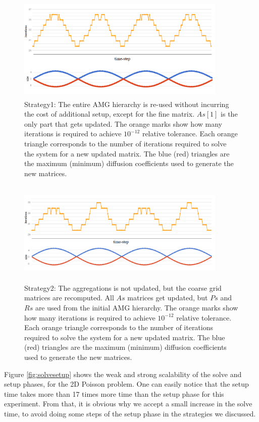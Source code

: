 \begin{figure}[H]
 \centering
 \includegraphics[width=10cm,height=5cm]{./figures/update2-3.png}
 \caption{Strategy1: The entire AMG hierarchy is re-used without incurring the cost of additional setup, except for the fine matrix. $As[1]$ is the only part that gets updated.
          The orange marks show how many iterations is required to achieve $10^{-12}$ relative tolerance.
          Each orange triangle corresponds to the number of iterations required to solve the system for a new updated matrix.
          The blue (red) triangles are the maximum (minimum) diffusion coefficients used to generate the new matrices.}
 \label{fig:strategy1}
\end{figure}

\begin{figure}[H]
 \centering
 \includegraphics[width=10cm,height=5cm]{./figures/update3-3.png}
 \caption{Strategy2: The aggregations is not updated, but the coarse grid matrices are recomputed. 
 All $As$ matrices get updated, but $Ps$ and $Rs$ are used from the initial AMG hierarchy.
          The orange marks show how many iterations is required to achieve $10^{-12}$ relative tolerance.
          Each orange triangle corresponds to the number of iterations required to solve the system for a new updated matrix.
          The blue (red) triangles are the maximum (minimum) diffusion coefficients used to generate the new matrices.}
 \label{fig:strategy2}
\end{figure}

Figure \ref{fig:solvesetup} shows the weak and strong scalability of the solve and setup phases,
for the 2D Poisson problem. One can easily notice that the setup time takes more than 17 times more time than the setup phase for this experiment.
From that, it is obvious why we accept a small increase in the solve time, to avoid doing some steps of the setup phase in the strategies we discussed.

